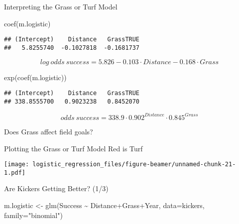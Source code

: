 \documentclass[
  ignorenonframetext,
]{beamer}
\newenvironment{Shaded}{\begin{snugshade}}{\end{snugshade}}
\newcommand{\AttributeTok}[1]{\textcolor[rgb]{0.77,0.63,0.00}{#1}}
\newcommand{\FunctionTok}[1]{\textcolor[rgb]{0.00,0.00,0.00}{#1}}
\newcommand{\NormalTok}[1]{#1}
\newcommand{\OtherTok}[1]{\textcolor[rgb]{0.56,0.35,0.01}{#1}}
\newcommand{\SpecialCharTok}[1]{\textcolor[rgb]{0.00,0.00,0.00}{#1}}
\newcommand{\StringTok}[1]{\textcolor[rgb]{0.31,0.60,0.02}{#1}}
\begin{document}
\begin{frame}[fragile]{Interpreting the Grass or Turf Model}
\protect\hypertarget{interpreting-the-grass-or-turf-model}{}
\begin{Shaded}
\begin{Highlighting}[]
\FunctionTok{coef}\NormalTok{(m.logistic)}
\end{Highlighting}
\end{Shaded}

\begin{verbatim}
## (Intercept)    Distance   GrassTRUE 
##   5.8255740  -0.1027818  -0.1681737
\end{verbatim}

\[log\ odds\ success = 5.826 -0.103 \cdot Distance -0.168 \cdot Grass\]

\begin{Shaded}
\begin{Highlighting}[]
\FunctionTok{exp}\NormalTok{(}\FunctionTok{coef}\NormalTok{(m.logistic))}
\end{Highlighting}
\end{Shaded}

\begin{verbatim}
## (Intercept)    Distance   GrassTRUE 
## 338.8555700   0.9023238   0.8452070
\end{verbatim}

\[odds\ success = 338.9 \cdot 0.902^{Distance} \cdot 0.845^{Grass}\]

Does Grass affect field goals?
\end{frame}

\begin{frame}{Plotting the Grass or Turf Model}
\protect\hypertarget{plotting-the-grass-or-turf-model}{}
Red is Turf

\texttt{[image: logistic\_regression\_files/figure-beamer/unnamed-chunk-21-1.pdf]}
\end{frame}

\begin{frame}[fragile]{Are Kickers Getting Better? (1/3)}
\protect\hypertarget{are-kickers-getting-better-13}{}
\begin{Shaded}
\begin{Highlighting}[]
\NormalTok{m.logistic }\OtherTok{\textless{}{-}} \FunctionTok{glm}\NormalTok{(Success }\SpecialCharTok{\textasciitilde{}}\NormalTok{ Distance}\SpecialCharTok{+}\NormalTok{Grass}\SpecialCharTok{+}\NormalTok{Year,}
                  \AttributeTok{data=}\NormalTok{kickers, }\AttributeTok{family=}\StringTok{"binomial"}\NormalTok{)}
\end{Highlighting}
\end{Shaded}
\end{frame}
\end{document}
